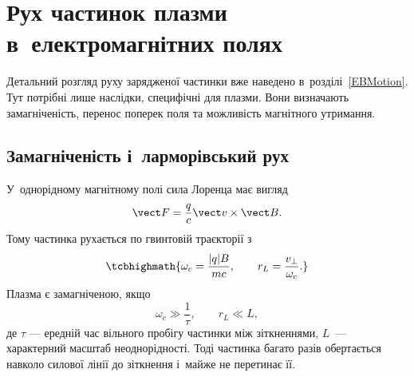 \section{Рух частинок плазми в~електромагнітних полях}\label{sec:particle-motion}\hypertarget{particle-motion}{}

Детальний розгляд руху зарядженої частинки вже наведено в~розділі~\ref{EBMotion}. Тут потрібні лише
наслідки, специфічні для плазми. Вони визначають замагніченість, перенос поперек поля та
можливість магнітного утримання.

\subsection*{Замагніченість і~ларморівський рух}



У~однорідному магнітному полі сила Лоренца має вигляд
\begin{equation*}
	\vect F=\frac qc\vect v\times\vect B.
\end{equation*}
Тому частинка рухається по гвинтовій траєкторії з~
\begin{equation}\label{eq:larmor}
	\tcbhighmath{\omega_c=\frac{|q|B}{mc},\qquad r_L=\frac{v_\perp}{\omega_c}.}
\end{equation}
Плазма є замагніченою, якщо
\begin{equation*}
	\omega_c\gg\frac1\tau,\qquad r_L\ll L,
\end{equation*}
де $\tau$ --- ередній час вільного пробігу частинки між зіткненнями, $L$~--- характерний масштаб неоднорідності. Тоді частинка багато разів обертається навколо силової лінії до зіткнення і~майже не перетинає її.


